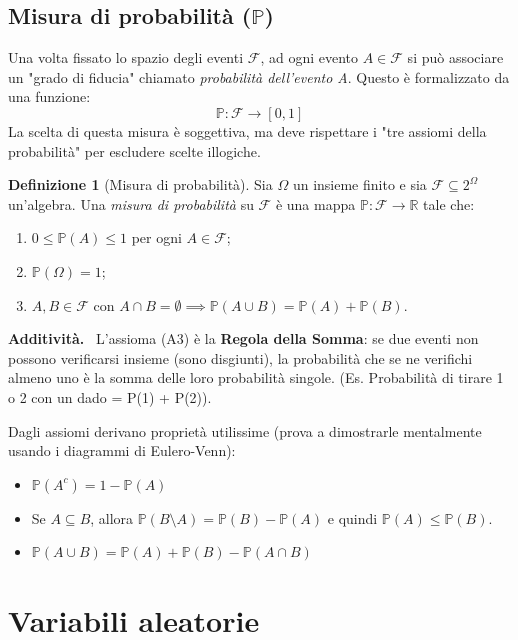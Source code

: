 \documentclass[11pt, a4paper]{report}
\theoremstyle{plain}
\theoremstyle{definition}
\newtheorem{definition}[theorem]{Definizione}
\theoremstyle{remark}
\newenvironment{hint}[1][Hint]
{\begin{mdframed}[backgroundcolor=blue!5, linecolor=blue!50, linewidth=2pt, topline=false, rightline=false, bottomline=false]
\textbf{\textsf{#1.}}\ }
{\end{mdframed}}
\newcommand{\PP}{\mathbb{P}}
\newcommand{\F}{\mathcal{F}}
\newcommand{\R}{\mathbb{R}}
\newcommand{\1}{\mathbf{1}}
\begin{document}
\subsection{Misura di probabilità ($\PP$)}

Una volta fissato lo spazio degli eventi $\F$, ad ogni evento $A \in \F$ si può associare un "grado di fiducia" chiamato \emph{probabilità dell'evento A}. Questo è formalizzato da una funzione:
\[ \PP : \F \to [0, 1] \]
La scelta di questa misura è soggettiva, ma deve rispettare i "tre assiomi della probabilità" per escludere scelte illogiche.

\begin{definition}[Misura di probabilità]
Sia $\Omega$ un insieme finito e sia $\F \subseteq 2^\Omega$ un'algebra. Una \emph{misura di probabilità} su $\F$ è una mappa $\PP : \F \to \R$ tale che:
\begin{enumerate}[(A1)]
    \item $0 \le \PP(A) \le 1$ per ogni $A \in \F$;
    \item $\PP(\Omega) = 1$;
    \item $A, B \in \F$ con $A \cap B = \emptyset \implies \PP(A \cup B) = \PP(A) + \PP(B)$.
\end{enumerate}
\end{definition}

\begin{hint}[Additività]
    L'assioma (A3) è la \textbf{Regola della Somma}: se due eventi non possono verificarsi insieme (sono disgiunti), la probabilità che se ne verifichi almeno uno è la somma delle loro probabilità singole. (Es. Probabilità di tirare 1 o 2 con un dado = P(1) + P(2)).
\end{hint}

Dagli assiomi derivano proprietà utilissime (prova a dimostrarle mentalmente usando i diagrammi di Eulero-Venn):
\begin{itemize}
    \item $\PP(A^c) = 1 - \PP(A)$
    \item Se $A \subseteq B$, allora $\PP(B \setminus A) = \PP(B) - \PP(A)$ e quindi $\PP(A) \le \PP(B)$.
    \item $\PP(A \cup B) = \PP(A) + \PP(B) - \PP(A \cap B)$
\end{itemize}

\section{Variabili aleatorie}
\end{document}
